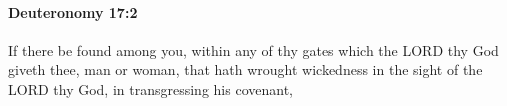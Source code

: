 
		\paragraph{Deuteronomy 17:2} %
			\label{DEUTERONOMY-17-2}

			If there be found among you, within any of thy gates which the LORD thy God giveth thee, man or woman, that hath wrought wickedness in the sight of the LORD thy God, in transgressing his covenant,


